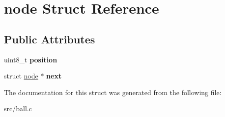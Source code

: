 \hypertarget{structnode}{\section{node Struct Reference}
\label{structnode}
}
\subsection*{Public Attributes}
\begin{DoxyCompactItemize}
\item 
\hypertarget{structnode_a5b6c19c1aa39cce4f599d22ee0283d0d}{uint8\-\_\-t {\bfseries position}}\label{structnode_a5b6c19c1aa39cce4f599d22ee0283d0d}

\item 
\hypertarget{structnode_aa3e8aa83f864292b5a01210f4453fcc0}{struct \hyperlink{structnode}{node} $\ast$ {\bfseries next}}\label{structnode_aa3e8aa83f864292b5a01210f4453fcc0}

\end{DoxyCompactItemize}


The documentation for this struct was generated from the following file\-:\begin{DoxyCompactItemize}
\item 
src/ball.\-c\end{DoxyCompactItemize}
